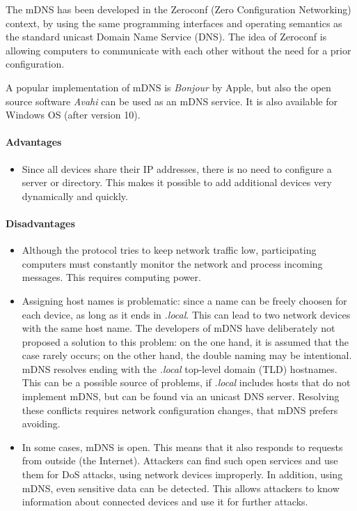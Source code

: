 \documentclass[fleqn, 11pt]{SelfArx} %
\begin{document}
The mDNS has been developed in the Zeroconf (Zero Configuration Networking) context, by using the same programming interfaces and operating semantics as the standard unicast Domain Name Service (DNS). 
The idea of Zeroconf is allowing computers to communicate with each other without the need for a prior configuration.\newline

A popular implementation of mDNS is \textit{Bonjour} by Apple, but also the open source software \textit{Avahi} can be used as an mDNS service. It is also available for Windows OS (after version 10).

\paragraph{Advantages} 
\begin{itemize}[leftmargin=*]
    \item Since all devices share their IP addresses, there is no need to configure a server or directory. This makes it possible to add additional devices very dynamically and quickly.
\end{itemize}

\paragraph{Disadvantages} 
\begin{itemize}[leftmargin=*]
    \item Although the protocol tries to keep network traffic low, participating computers must constantly monitor the network and process incoming messages. This requires computing power.
    \item Assigning host names is problematic: since a name can be freely choosen for each device, as long as it ends in {\it{.local}}. This can lead to two network devices with the same host name. The developers of mDNS have deliberately not proposed a solution to this problem: on the one hand, it is assumed that the case rarely occurs; on the other hand, the double naming may be intentional. \newline 
    mDNS resolves ending with the {\it{.local}} top-level domain (TLD) hostnames. This can be a possible source of problems, if {\it{.local}} includes hosts that do not implement mDNS, but can be found via an unicast DNS server. Resolving these conflicts requires network configuration changes, that mDNS prefers avoiding.
    \item In some cases, mDNS is open. This means that it also responds to requests from outside (the Internet). Attackers can find such open services and use them for DoS attacks, using network devices improperly. \newline
    In addition, using mDNS, even sensitive data can be detected. This allows attackers to know information about connected devices and use it for further attacks.
\end{itemize}
\end{document}

